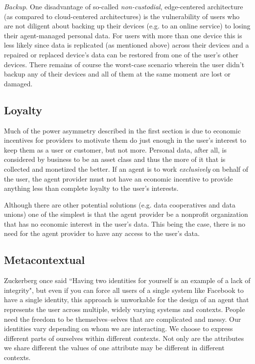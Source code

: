 \documentclass[11pt, oneside]{article}   	%
\begin{document}
\emph{Backup}. One disadvantage of so-called \emph{non-custodial}, edge-centered architecture (as compared to cloud-centered architectures) is the vulnerability of users who are not diligent about backing up their devices (e.g. to an online service) to losing their agent-managed personal data. For users with more than one device this is less likely since data is replicated (as mentioned above) across their devices and a repaired or replaced device's data can be restored from one of the user's other devices. There remains of course the worst-case scenario wherein the user didn't backup any of their devices and all of them at the same moment are lost or damaged. 

\subsection{Loyalty}

Much of the power asymmetry described in the first section is due to economic incentives for providers to motivate them do just enough in the user's interest to keep them as a user or customer, but not more. Personal data, after all, is considered by business to be an asset class and thus the more of it that is collected and monetized the better. If an agent is to work \emph{exclusively} on behalf of the user, the agent provider must not have an economic incentive to provide anything less than complete loyalty to the user's interests. 

Although there are other potential solutions (e.g. data cooperatives and data unions) one of the simplest is that the agent provider be a nonprofit organization that has no economic interest in the user's data. This being the case, there is no need for the agent provider to have any access to the user's data.

\subsection{Metacontextual}

Zuckerberg once said ``Having two identities for yourself is an example of a lack of integrity"\cite{Kirkpatrick2011}, but even if you can force all users of a single system like Facebook to have a single identity, this approach is unworkable for the design of an agent that represents the user across multiple, widely varying systems and contexts. People need the freedom to be themselves--selves that are complicated and messy. Our identities vary depending on whom we are interacting. We choose to express different parts of ourselves within different contexts. Not only are the attributes we share different the values of one attribute may be different in different contexts. 
\end{document}
